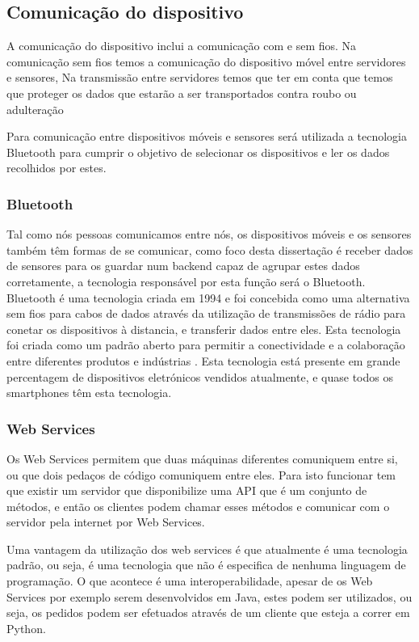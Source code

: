 \subsection{Comunicação do dispositivo}
A comunicação do dispositivo inclui a comunicação com e sem fios. Na comunicação sem fios temos a comunicação do dispositivo móvel entre servidores e sensores, Na transmissão entre servidores temos que ter em conta que temos que proteger os dados que estarão a ser transportados contra roubo ou adulteração
\par
Para comunicação entre dispositivos móveis e sensores será utilizada a tecnologia Bluetooth para cumprir o objetivo de selecionar os dispositivos e ler os dados recolhidos por estes.


\subsubsection{Bluetooth}

Tal como nós pessoas comunicamos entre nós, os dispositivos móveis e os sensores também têm formas de se comunicar, como foco desta dissertação é receber dados de sensores para os guardar num backend capaz de agrupar estes dados corretamente, a tecnologia responsável por esta função será o Bluetooth.
Bluetooth é uma tecnologia criada em 1994 e foi concebida como uma alternativa sem fios para cabos de dados através da utilização de transmissões de rádio para conetar os dispositivos à distancia, e transferir dados entre eles. Esta tecnologia foi criada como um padrão aberto para permitir a conectividade e a colaboração entre diferentes produtos e indústrias \cite{bluetooth}.
Esta tecnologia está presente em grande percentagem de dispositivos eletrónicos vendidos atualmente, e quase todos os smartphones têm esta tecnologia.


\subsubsection{Web Services}

Os Web Services permitem que duas máquinas diferentes comuniquem entre si, ou que dois pedaços de código comuniquem entre eles. Para isto funcionar tem que existir um servidor que disponibilize uma \gls{API} que é um conjunto de métodos, e então os clientes podem chamar esses métodos e comunicar com o servidor pela internet por Web Services.

Uma vantagem da utilização dos web services é que atualmente é uma tecnologia padrão, ou seja, é uma tecnologia que não é especifica de nenhuma linguagem de programação. O que acontece é uma interoperabilidade, apesar de os Web Services por exemplo serem desenvolvidos em Java, estes podem ser utilizados, ou seja, os pedidos podem ser efetuados através de um cliente que esteja a correr em Python.

